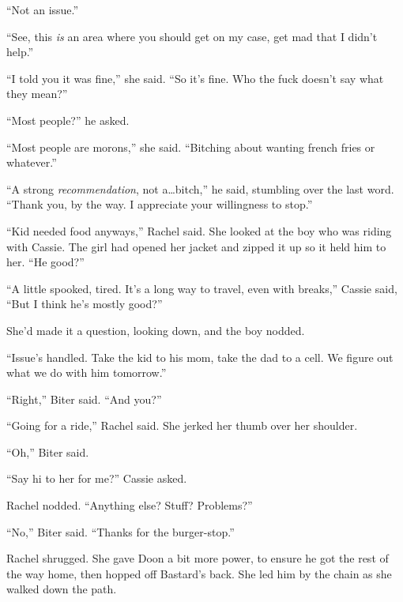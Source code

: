 ``Not an issue.''



``See, this \emph{is} an area where you should get on my case, get mad that I didn't help.''



``I told you it was fine,'' she said.  ``So it's fine.  Who the fuck doesn't say what they mean?''



``Most people?'' he asked.



``Most people are morons,'' she said.  ``Bitching about wanting french fries or whatever.''



``A strong \emph{recommendation}, not a\ldots bitch,'' he said, stumbling over the last word.  ``Thank you, by the way.  I appreciate your willingness to stop.''



``Kid needed food anyways,'' Rachel said.  She looked at the boy who was riding with Cassie.  The girl had opened her jacket and zipped it up so it held him to her.  ``He good?''



``A little spooked, tired.  It's a long way to travel, even with breaks,'' Cassie said, ``But I think he's mostly good?''



She'd made it a question, looking down, and the boy nodded.



``Issue's handled.  Take the kid to his mom, take the dad to a cell.  We figure out what we do with him tomorrow.''



``Right,'' Biter said.  ``And you?''



``Going for a ride,'' Rachel said.  She jerked her thumb over her shoulder.



``Oh,'' Biter said.



``Say hi to her for me?'' Cassie asked.



Rachel nodded.  ``Anything else?  Stuff?  Problems?''



``No,'' Biter said.  ``Thanks for the burger-stop.''



Rachel shrugged.  She gave Doon a bit more power, to ensure he got the rest of the way home, then hopped off Bastard's back.  She led him by the chain as she walked down the path.



